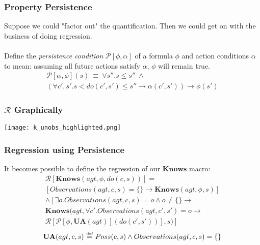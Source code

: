 \documentclass{beamer}
\newcommand{\isdef}{\hbox{$\stackrel{\mbox{\tiny def}}{=}$}}
\begin{document}
\begin{frame}
\frametitle{Property Persistence}
Suppose we could "factor out" the quantification. Then we could get
on with the business of doing regression. 
\ \\
\ \\
Define the \emph{persistence condition} $\mathcal{P}[\phi,\alpha]$ of a formula
 $\phi$ and action conditions $\alpha$ to mean: assuming all future actions
satisfy $\alpha$, $\phi$ will remain true.
\begin{multline*}
  \mathcal{P}[\alpha,\phi](s)\ \equiv\ \forall s''.s \leq s'' \ \wedge\\
    \left( \forall c',s' . s<do(c',s')\leq s'' \rightarrow \alpha (c',s') \right) \rightarrow \phi(s')
\end{multline*}
\end{frame}

\begin{frame}
\frametitle{$\mathcal{R}$ Graphically}
\begin{center}
  \texttt{[image: k\_unobs\_highlighted.png]}
\end{center}
\end{frame}

\begin{frame}
\frametitle{Regression using Persistence}
It becomes possible to define the regression of our $\mathbf{Knows}$ macro:
\begin{multline*}
  \mathcal{R}[\mathbf{Knows}(agt,\phi,do(c,s))] = \\
     \left[ Observations(agt,c,s) = \{\} \rightarrow \mathbf{Knows}(agt,\phi,s) \right] \\
     \wedge \left[ \exists o . Observations(agt,c,s) = o \wedge o\neq \{\} \rightarrow \right. \\
     \mathbf{Knows}(agt,\forall c' . Observations(agt,c',s')=o \rightarrow \\
     \left.\mathcal{R}[\mathcal{P}[\phi,\mathbf{UA}(agt)](do(c',s'))],s)\right]
\end{multline*}
\begin{equation*}
  \mathbf{UA}(agt,c,s)\ \isdef\ Poss(c,s) \wedge Observations(agt,c,s) = \{\}
\end{equation*}
\end{frame}
\end{document}
